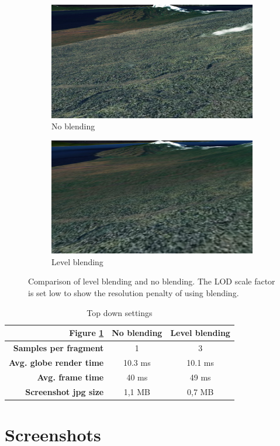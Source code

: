 \begin{figure}[htbp]
    \centering
    \begin{subfigure}[bt]{0.48\textwidth}
        \includegraphics[width=\textwidth]{figures/results/blending/blending_bali_disabled.jpg}
        \caption{No blending}
    \end{subfigure}
    \begin{subfigure}[bt]{0.48\textwidth}
        \includegraphics[width=\textwidth]{figures/results/blending/blending_bali_enabled.jpg}
        \caption{Level blending}
    \end{subfigure}
    \caption{Comparison of level blending and no blending. The LOD scale factor is set low to show the resolution penalty of using blending.}
    \label{fig:blending}
\end{figure}

\begin{table}
\centering
\caption[]{Top down settings}
  \label{table:settingstopdown}
  \begin{tabular}{| r | c c |}
    \hline
      \textbf{Figure \ref{fig:blending}}  & \textbf{No blending} & \textbf{Level blending} \\ \hline
      \textbf{Samples per fragment} & 1 & 3 \\ 
      \textbf{Avg. globe render time}  & 10.3 ms & 10.1 ms \\ 
      \textbf{Avg. frame time}  & 40 ms &  49 ms \\ 
      \textbf{Screenshot jpg size} & 1,1 MB & 0,7 MB \\
    \hline
  \end{tabular}
\end{table}



\section{Screenshots}
